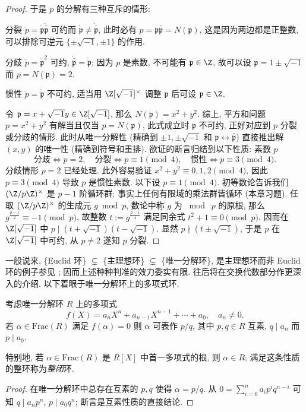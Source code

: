 \begin{proof}
	于是 $p$ 的分解有三种互斥的情形:
	\begin{compactdesc}
		\item[分裂] $\mathring{p} = \mathring{\mathfrak{p}} \mathring{\bar{\mathfrak{p}}}$ 可约而 $\mathring{\mathfrak{p}} \neq \mathring{\bar{\mathfrak{p}}}$, 此时必有 $p = \mathfrak{p}\bar{\mathfrak{p}} = N(\mathfrak{p})$, 这是因为两边都是正整数, 可以排除可逆元 $\{\pm\sqrt{-1}, \pm 1\}$ 的作用.
		\item[分歧] $\mathring{p} = \mathring{\mathfrak{p}}^2$ 可约, $\mathring{\bar{\mathfrak{p}}} = \mathring{\mathfrak{p}}$; 因为 $p$ 是素数, 不可能有 $\mathfrak{p} \in \Z$, 故可以设 $\mathfrak{p} = 1 \pm \sqrt{-1}$ 而 $p = N(\mathfrak{p}) = 2$.
		\item[惯性] $\mathring{p} = \mathring{\mathfrak{p}}$ 不可约, 适当用 $\Z[\sqrt{-1}]^\times$ 调整 $\mathfrak{p}$ 后可设 $\mathfrak{p} \in \Z$.
	\end{compactdesc}
	令 $\mathfrak{p} = x + \sqrt{-1}y \in \Z[\sqrt{-1}]$, 那么 $N(\mathfrak{p}) = x^2 + y^2$. 综上, 平方和问题 $p = x^2 + y^2$ 有解当且仅当 $p = N(\mathfrak{p})$, 此式成立时 $\mathfrak{p}$ 不可约, 正好对应到 $p$ 分裂或分歧的情形. 此时从唯一分解性 (精确到 $\pm 1, \pm\sqrt{-1}$ 和 $\mathfrak{p} \leftrightarrow \bar{\mathfrak{p}}$) 直接推出解 $(x,y)$ 的唯一性 (精确到符号和重排). 欲证的断言归结到以下性质: 素数 $p$
	\[ \text{分歧} \iff p=2, \quad \text{分裂} \iff p \equiv 1 \pmod{4}, \quad \text{惯性} \iff p \equiv 3 \pmod{4}. \]
	分歧情形 $p=2$ 已经处理. 此外容易验证 $x^2 + y^2 \equiv 0,1,2 \pmod{4}$, 因此 $p \equiv 3 \pmod{4}$ 导致 $p$ 是惯性素数. 以下设 $p \equiv 1 \pmod{4}$. 初等数论告诉我们 $(\Z/p\Z)^\times$ 是 $p-1$ 阶循环群; 事实上任何有限域的乘法群皆循环 (本章习题). 任取 $(\Z/p\Z)^\times$ 的生成元 $g \bmod p$, 数论中称 $g$ 为 $\bmod\; p$ 的原根, 那么 $g^{\frac{p-1}{2}} \equiv -1 \pmod p$, 故整数 $t := g^{\frac{p-1}{4}}$ 满足同余式 $t^2 + 1 \equiv 0 \pmod p$. 因而在 $\Z[\sqrt{-1}]$ 中 $p  \mid  (t + \sqrt{-1})(t - \sqrt{-1})$. 显然 $p \nmid (t \pm \sqrt{-1})$, 于是 $p$ 在 $\Z[\sqrt{-1}]$ 中可约, 从 $p \neq 2$ 遂知 $p$ 分裂.
\end{proof}

一般说来, \{Euclid 环\} $\subsetneq$ \{主理想环\} $\subsetneq$ \{唯一分解环\}, 是主理想环而非 Euclid 环的例子参见 \cite{Wil73}; 因而上述种种判准的效力委实有限. 往后将在交换代数部分作更深入的介绍. 以下着眼于唯一分解环上的多项式环.

\begin{proposition}[一次因式检验法]
	考虑唯一分解环 $R$ 上的多项式
	\[ f(X) = a_n X^n + a_{n-1}X^{n-1} + \cdots + a_0, \quad a_n \neq 0. \]
	若 $\alpha  \in \text{Frac}(R)$ 满足 $f(\alpha)=0$ 则 $\alpha$ 可表作 $p/q$, 其中 $p,q \in R$ 互素, $q \mid a_n$ 而 $p \mid a_0$.
\end{proposition}
特别地, 若 $\alpha \in \text{Frac}(R)$ 是 $R[X]$ 中首一多项式的根, 则 $\alpha \in R$; 满足这条性质的整环称为\emph{整闭}环. 
\begin{proof}
	在唯一分解环中总存在互素的 $p,q$ 使得 $\alpha = p/q$. 从 $0 = \sum_{i=0}^n a_i p^i q^{n-i}$ 可知 $q  \mid  a_n p^n$, $p  \mid  a_0 q^n$; 断言是互素性质的直接结论.
\end{proof}

